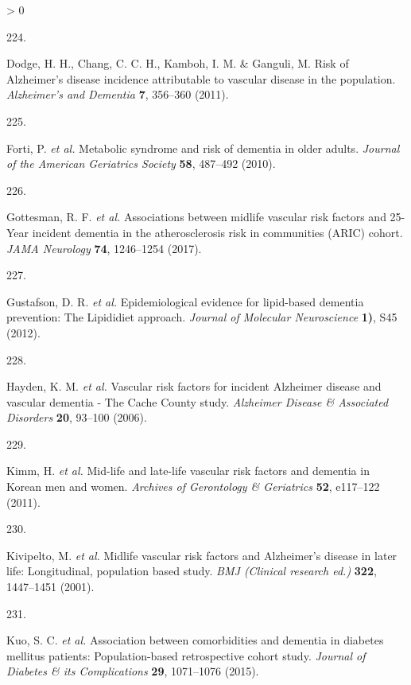 \documentclass[a4paper, twoside]{templates/ociamthesis}
\newlength{\cslhangindent}
\newlength{\csllabelwidth}
\newenvironment{CSLReferences}[3] %
 {%
  \setlength{\parindent}{0pt}
  \ifodd #1 \everypar{\setlength{\hangindent}{\cslhangindent}}\ignorespaces\fi
  \ifnum #2 > 0
  \setlength{\parskip}{#2\baselineskip}
  \fi
 }%
 {}
\newcommand{\CSLLeftMargin}[1]{\parbox[t]{\maxof{\widthof{#1}}{\csllabelwidth}}{#1}}
\newcommand{\CSLRightInline}[1]{\parbox[t]{\linewidth - \csllabelwidth}{#1}}
\begin{document}
\begin{CSLReferences}{0}{0}
\leavevmode\hypertarget{ref-dodge2011}{}%
\CSLLeftMargin{224. }
\CSLRightInline{Dodge, H. H., Chang, C. C. H., Kamboh, I. M. \& Ganguli, M. Risk of {Alzheimer}'s disease incidence attributable to vascular disease in the population. \emph{Alzheimer's and Dementia} \textbf{7}, 356--360 (2011).}

\leavevmode\hypertarget{ref-forti2010}{}%
\CSLLeftMargin{225. }
\CSLRightInline{Forti, P. \emph{et al.} Metabolic syndrome and risk of dementia in older adults. \emph{Journal of the American Geriatrics Society} \textbf{58}, 487--492 (2010).}

\leavevmode\hypertarget{ref-gottesman2017}{}%
\CSLLeftMargin{226. }
\CSLRightInline{Gottesman, R. F. \emph{et al.} Associations between midlife vascular risk factors and 25-{Year} incident dementia in the atherosclerosis risk in communities ({ARIC}) cohort. \emph{JAMA Neurology} \textbf{74}, 1246--1254 (2017).}

\leavevmode\hypertarget{ref-gustafson2012}{}%
\CSLLeftMargin{227. }
\CSLRightInline{Gustafson, D. R. \emph{et al.} Epidemiological evidence for lipid-based dementia prevention: The {Lipididiet} approach. \emph{Journal of Molecular Neuroscience} \textbf{1)}, S45 (2012).}

\leavevmode\hypertarget{ref-hayden2006}{}%
\CSLLeftMargin{228. }
\CSLRightInline{Hayden, K. M. \emph{et al.} Vascular risk factors for incident {Alzheimer} disease and vascular dementia - {The Cache County} study. \emph{Alzheimer Disease \& Associated Disorders} \textbf{20}, 93--100 (2006).}

\leavevmode\hypertarget{ref-kimm2011}{}%
\CSLLeftMargin{229. }
\CSLRightInline{Kimm, H. \emph{et al.} Mid-life and late-life vascular risk factors and dementia in {Korean} men and women. \emph{Archives of Gerontology \& Geriatrics} \textbf{52}, e117--122 (2011).}

\leavevmode\hypertarget{ref-kivipelto2001}{}%
\CSLLeftMargin{230. }
\CSLRightInline{Kivipelto, M. \emph{et al.} Midlife vascular risk factors and {Alzheimer}'s disease in later life: Longitudinal, population based study. \emph{BMJ (Clinical research ed.)} \textbf{322}, 1447--1451 (2001).}

\leavevmode\hypertarget{ref-kuo2015}{}%
\CSLLeftMargin{231. }
\CSLRightInline{Kuo, S. C. \emph{et al.} Association between comorbidities and dementia in diabetes mellitus patients: Population-based retrospective cohort study. \emph{Journal of Diabetes \& its Complications} \textbf{29}, 1071--1076 (2015).}


\end{CSLReferences}
\end{document}
